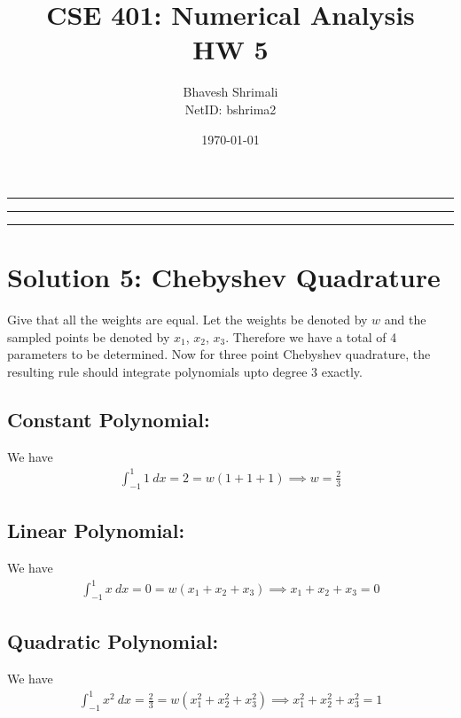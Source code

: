
\title{\bf CSE 401: Numerical Analysis \\ HW 5}
\author{Bhavesh Shrimali \\ NetID: bshrima2}
\date{\today}
\titlespacing*{\title}{-2ex}{*-2ex}{-2ex}

\maketitle \hrule \hrule \hrule
\section*{Solution 5: Chebyshev Quadrature}
Give that all the weights are equal. Let the weights be denoted by $w$ and the sampled points be denoted by $x_1$, $x_2$, $x_3$. Therefore we have a total of 4 parameters to be determined. Now for three point Chebyshev quadrature, the resulting rule should integrate polynomials upto degree 3 exactly.   
\subsection*{Constant Polynomial: }
We have
\begin{align}
\int_{-1}^1 1\ dx = 2 = w \left( 1 + 1 + 1 \right) \implies w = \frac{2}{3}
\end{align}
\subsection*{Linear Polynomial: }
We have
\begin{align}
\int_{-1}^1 x\ dx = 0 = w \left( x_1 + x_2 + x_3 \right) \implies  x_1 + x_2 + x_3 = 0
\end{align}
\subsection*{Quadratic Polynomial: }
We have
\begin{align}
\int_{-1}^1 x^2\ dx = \frac{2}{3} = w \left( x^2_1 + x^2_2 + x^2_3 \right) \implies  x^2_1 + x^2_2 + x^2_3 = 1
\end{align}
